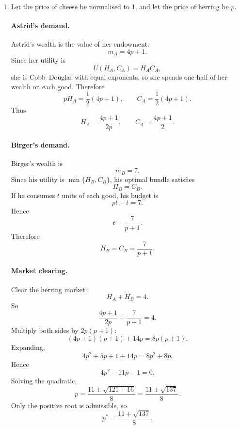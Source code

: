 \documentclass[12pt]{article}
\begin{document}
\begin{enumerate}[label=(\alph*)]
\begin{center}
\end{center}



    \item
    Let the price of cheese be normalised to 1, and let the price of herring be \(p\).

    \paragraph{Astrid's demand.}
    Astrid's wealth is the value of her endowment:
    \[
    m_A = 4p+1.
    \]
    Since her utility is
    \[
    U(H_A,C_A)=H_A C_A,
    \]
    she is Cobb--Douglas with equal exponents, so she spends one-half of her wealth on each good. Therefore
    \[
    pH_A = \frac12 (4p+1),\qquad C_A=\frac12 (4p+1).
    \]
    Thus
    \[
    \boxed{H_A=\frac{4p+1}{2p},\qquad C_A=\frac{4p+1}{2}.}
    \]

    \paragraph{Birger's demand.}
    Birger's wealth is
    \[
    m_B=7.
    \]
    Since his utility is \(\min\{H_B,C_B\}\), his optimal bundle satisfies
    \[
    H_B=C_B.
    \]
    If he consumes \(t\) units of each good, his budget is
    \[
    pt+t=7.
    \]
    Hence
    \[
    t=\frac{7}{p+1}.
    \]
    Therefore
    \[
    \boxed{H_B=C_B=\frac{7}{p+1}.}
    \]

    \paragraph{Market clearing.}
    Clear the herring market:
    \[
    H_A+H_B=4.
    \]
    So
    \[
    \frac{4p+1}{2p}+\frac{7}{p+1}=4.
    \]
    Multiply both sides by \(2p(p+1)\):
    \[
    (4p+1)(p+1)+14p = 8p(p+1).
    \]
    Expanding,
    \[
    4p^2+5p+1+14p = 8p^2+8p.
    \]
    Hence
    \[
    4p^2-11p-1=0.
    \]
    Solving the quadratic,
    \[
    p=\frac{11\pm \sqrt{121+16}}{8}
    =\frac{11\pm \sqrt{137}}{8}.
    \]
    Only the positive root is admissible, so
    \[
    \boxed{p^{*}=\frac{11+\sqrt{137}}{8}.}
    \]


\end{enumerate}
\end{document}
